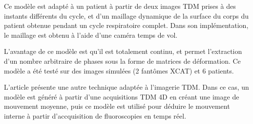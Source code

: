 Ce modèle est adapté à un patient à partir de deux images TDM prises à des instants différents du cycle, et d'un maillage dynamique de la surface du corps du patient obtenue pendant un cycle respiratoire complet. Dans son implémentation, le maillage est obtenu à l'aide d'une caméra temps de vol.

L'avantage de ce modèle est qu'il est totalement continu, et permet l'extraction d'un nombre arbitraire de phases sous la forme de matrices de déformation. Ce modèle a été testé sur des images simulées (2 fantômes XCAT) et 6 patients.

L'article \cite{vandemeulebroucke2009respiratory} présente une autre technique adaptée à l'imagerie TDM. Dans ce cas, un modèle est généré à partir d'une acquisitions TDM 4D en créant une image de mouvement moyenne, puis ce modèle est utilisé pour déduire le mouvement interne à partir d'accquisition de fluoroscopies en temps réel.